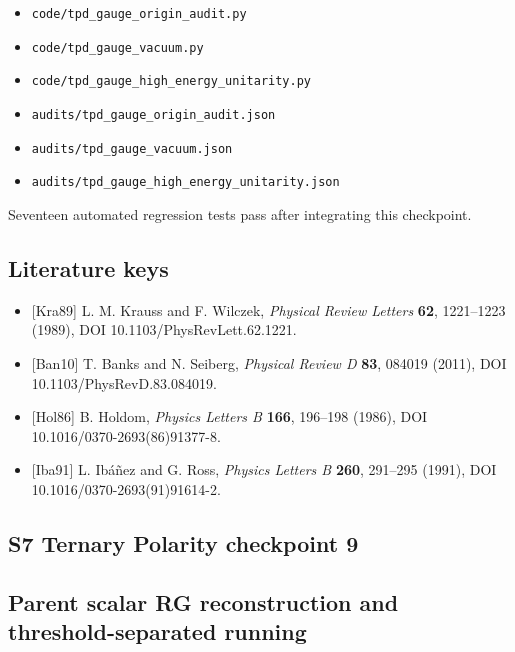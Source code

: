 \documentclass[
]{article}
\providecommand{\tightlist}{%
  \setlength{\itemsep}{0pt}\setlength{\parskip}{0pt}}
\begin{document}
\begin{itemize}
\tightlist
\item
  \texttt{code/tpd\_gauge\_origin\_audit.py}
\item
  \texttt{code/tpd\_gauge\_vacuum.py}
\item
  \texttt{code/tpd\_gauge\_high\_energy\_unitarity.py}
\item
  \texttt{audits/tpd\_gauge\_origin\_audit.json}
\item
  \texttt{audits/tpd\_gauge\_vacuum.json}
\item
  \texttt{audits/tpd\_gauge\_high\_energy\_unitarity.json}
\end{itemize}

Seventeen automated regression tests pass after integrating this
checkpoint.

\hypertarget{literature-keys-1}{%
\subsection{Literature keys}\label{literature-keys-1}}

\begin{itemize}
\tightlist
\item
  {[}Kra89{]} L. M. Krauss and F. Wilczek, \emph{Physical Review
  Letters} \textbf{62}, 1221--1223 (1989), DOI
  10.1103/PhysRevLett.62.1221.
\item
  {[}Ban10{]} T. Banks and N. Seiberg, \emph{Physical Review D}
  \textbf{83}, 084019 (2011), DOI 10.1103/PhysRevD.83.084019.
\item
  {[}Hol86{]} B. Holdom, \emph{Physics Letters B} \textbf{166}, 196--198
  (1986), DOI 10.1016/0370-2693(86)91377-8.
\item
  {[}Iba91{]} L. Ibáñez and G. Ross, \emph{Physics Letters B}
  \textbf{260}, 291--295 (1991), DOI 10.1016/0370-2693(91)91614-2.
\end{itemize}

\newpage

\hypertarget{s7-ternary-polarity-checkpoint-9}{%
\subsection{S7 Ternary Polarity checkpoint
9}\label{s7-ternary-polarity-checkpoint-9}}

\hypertarget{parent-scalar-rg-reconstruction-and-threshold-separated-running}{%
\subsection{Parent scalar RG reconstruction and threshold-separated
running}\label{parent-scalar-rg-reconstruction-and-threshold-separated-running}}
\end{document}
